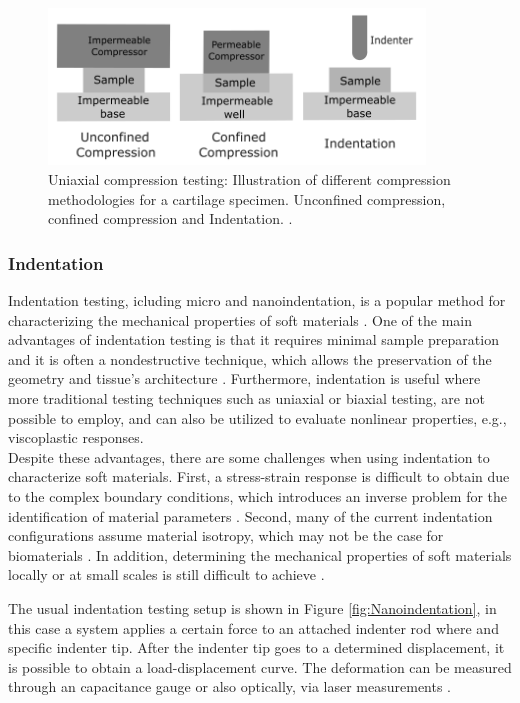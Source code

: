 \begin{figure}%
        \centering
       \quad
       \includegraphics[width=10cm]{Images/chapter1/compressiontypes.png}%
       \caption{Uniaxial compression testing: Illustration of different compression methodologies for a cartilage specimen. Unconfined compression, confined compression and Indentation. \cite{Griffin2016}.}%
       \label{fig:compressiontypes}%
\end{figure}

\subsubsection*{Indentation}
Indentation testing, icluding micro and nanoindentation, is a popular method for characterizing 
the mechanical properties of soft materials \cite{Wu2016}. One of the main advantages of 
indentation testing is that it requires minimal sample preparation and it is often a 
nondestructive technique, which allows the preservation of the geometry and tissue's architecture \cite{Shi2019}.
Furthermore, indentation is useful where more traditional testing techniques such as 
uniaxial or biaxial testing, are not possible to employ, 
and can also be utilized to evaluate nonlinear properties, e.g., viscoplastic responses\cite{Bergström2015}.\\

Despite these advantages, there are some challenges when using indentation to 
characterize soft materials. First, a stress-strain response is difficult to
obtain due to the complex boundary conditions, which introduces an inverse problem 
for the identification of material parameters \cite{Shi2019}. Second, many of the current 
indentation configurations assume material isotropy, which may not be the case for biomaterials \cite{Feng2017}.
In addition, determining the mechanical properties of soft materials locally or at small scales is still difficult to achieve \cite{Zhang2014}.


The usual indentation testing setup is shown in Figure \ref{fig:Nanoindentation}, in this case a 
system applies a certain force to an attached indenter rod where and specific 
indenter tip. After the indenter tip goes to a determined displacement, 
it is possible to obtain a load-displacement curve.
The deformation can be measured through an capacitance gauge or also optically, via laser measurements \cite{Bergström2015}.\\

